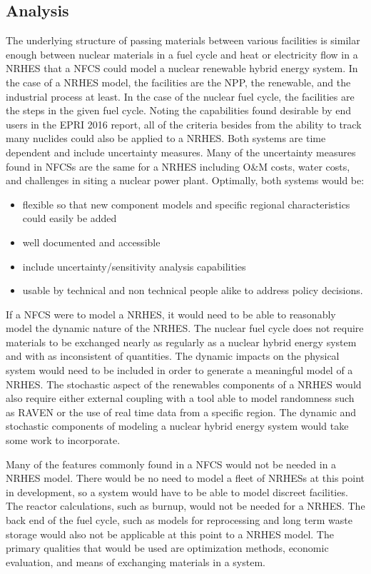 \documentclass{article}                                                                           %
\begin{document}
\begin{linenumbers}
\section{Analysis}
The underlying structure of passing materials between various facilities is similar enough between nuclear materials in a fuel cycle and heat or electricity flow in a NRHES that a NFCS could model a nuclear renewable hybrid energy system. In the case of a NRHES model, the facilities are the NPP, the renewable, and the industrial process at least.  In the case of the nuclear fuel cycle, the facilities are the steps in the given fuel cycle. Noting the capabilities found desirable by end users in the EPRI 2016 report, all of the criteria besides from the ability to track many nuclides could also be applied to a NRHES. Both systems are time dependent and include uncertainty measures. Many of the uncertainty measures found in NFCSs are the same for a NRHES including O\&M costs, water costs, and challenges in siting a nuclear power plant. Optimally, both systems would be:
\begin{itemize}

\item flexible so that new component models and specific regional characteristics could easily be added
\item well documented and accessible
\item include uncertainty/sensitivity analysis capabilities
\item usable by technical and non technical people alike to address policy decisions.

\end{itemize}

If a NFCS were to model a NRHES, it would need to be able to reasonably model the dynamic nature of the NRHES.  The nuclear fuel cycle does not require materials to be exchanged nearly as regularly as a nuclear hybrid energy system and with as inconsistent of quantities. The dynamic impacts on the physical system would need to be included in order to generate a meaningful model of a NRHES. The stochastic aspect of the renewables components of a NRHES would also require either external coupling with a tool able to model randomness such as RAVEN or the use of real time data from a specific region. The dynamic and stochastic components of modeling a nuclear hybrid energy system would take some work to incorporate.

Many of the features commonly found in a NFCS would not be needed in a NRHES model.  There would be no need to model a fleet of NRHESs at this point in development, so a system would have to be able to model discreet facilities.  The reactor calculations, such as burnup, would not be needed for a NRHES.  The back end of the fuel cycle, such as models for reprocessing and long term waste storage would also not be applicable at this point to a NRHES model.  The primary qualities that would be used are optimization methods, economic evaluation, and means of exchanging materials in a system.


\end{linenumbers}
\end{document}

